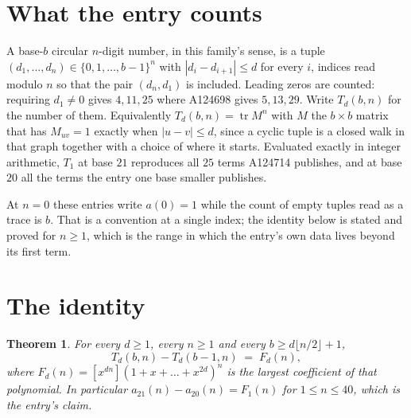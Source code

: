 \documentclass[11pt,a4paper]{article}
\theoremstyle{plain}
\newtheorem{theorem}{Theorem}
\theoremstyle{definition}
\begin{document}
\section{What the entry counts}

A base-$b$ circular $n$-digit number, in this family's sense, is a tuple
$(d_1,\dots,d_n)\in\{0,1,\dots,b-1\}^{n}$ with $|d_i-d_{i+1}|\le d$ for every $i$, indices
read modulo $n$ so that the pair $(d_n,d_1)$ is included. Leading zeros are counted: requiring
$d_1\ne0$ gives $4,11,25$ where A124698 gives $5,13,29$. Write $T_d(b,n)$ for the number of
them. Equivalently $T_d(b,n)=\operatorname{tr}M^{n}$ with $M$ the $b\times b$ matrix that has
$M_{uv}=1$ exactly when $|u-v|\le d$, since a cyclic tuple is a closed walk in that graph
together with a choice of where it starts. Evaluated exactly in integer arithmetic, $T_{1}$
at base $21$ reproduces all $25$ terms A124714 publishes, and at base $20$ all the
terms the entry one base smaller publishes.

At $n=0$ these entries write $a(0)=1$ while the count of empty tuples read as a trace is $b$.
That is a convention at a single index; the identity below is stated and proved for $n\ge1$,
which is the range in which the entry's own data lives beyond its first term.

\section{The identity}

\begin{theorem}
For every $d\ge1$, every $n\ge1$ and every $b\ge d\lfloor n/2\rfloor+1$,
\[
T_d(b,n)-T_d(b-1,n)\;=\;F_d(n),
\]
where $F_d(n)=[x^{dn}](1+x+\dots+x^{2d})^{n}$ is the largest coefficient of that
polynomial. In particular $a_{21}(n)-a_{20}(n)=F_{1}(n)$ for $1\le n\le40$, which
is the entry's claim.
\end{theorem}
\end{document}
